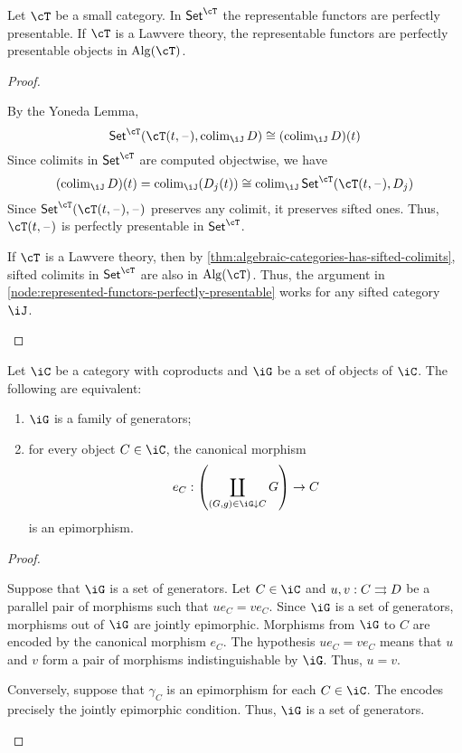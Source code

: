 \documentclass{zett}
\begin{document}
\begin{thm}\label{thm:represented-functors-perfectly-presentable}
  Let $\cT$ be a small category.
  In $\CSet^{\cT}$ the representable functors are perfectly presentable.
  If $\cT$ is a Lawvere theory, the representable functors are perfectly presentable objects in $\Alg(\cT)$.
\end{thm}
\begin{proof}
  \begin{node}\label{node:represented-functors-perfectly-presentable}
    By the Yoneda Lemma,
    \[
      \CSet^{\cT}(\cT(t,\blank), \colim_{\iJ} D) \iso (\colim_{\iJ} D)(t)
    \]
    Since colimits in $\CSet^{\cT}$ are computed objectwise, we have
    \[
      (\colim_{\iJ} D)(t) = \colim_{\iJ}(D_{j}(t)) \iso \colim_{\iJ}\CSet^{\cT}(\cT(t,\blank), D_{j})
    \]
    Since $\CSet^{\cT}(\cT(t,\blank), \blank)$ preserves any colimit, it preserves sifted ones.
    Thus, $\cT(t,\blank)$ is perfectly presentable in $\CSet^{\cT}$.
  \end{node}
  \begin{node}
    If $\cT$ is a Lawvere theory, then by \cref{thm:algebraic-categories-has-sifted-colimits}, sifted colimits in $\CSet^{\cT}$ are also in $\Alg(\cT)$.
    Thus, the argument in \cref{node:represented-functors-perfectly-presentable} works for any sifted category $\iJ$.
  \end{node}
\end{proof}

\begin{lem}\label{lem:coproduct-generators-epimorphism}
  Let $\iC$ be a category with coproducts and $\iG$ be a set of objects of $\iC$.
  The following are equivalent:
  \begin{enumerate}
  \item $\iG$ is a family of generators;
  \item for every object $C \in \iC$, the canonical morphism
    \[
      e_{C} : \left(\coprod_{(G, g) \in \iG \dn C} G\right) \to C
    \]
    is an epimorphism.
  \end{enumerate}
\end{lem}
\begin{proof}
  \begin{node}
    Suppose that $\iG$ is a set of generators.
    Let $C \in \iC$ and $u, v : C \rightrightarrows D$ be a parallel pair of morphisms such that $ue_{C} = ve_{C}$.
    Since $\iG$ is a set of generators, morphisms out of $\iG$ are jointly epimorphic.
    Morphisms from $\iG$ to $C$ are encoded by the canonical morphism $e_{C}$.
    The hypothesis $ue_{C} = ve_{C}$ means that $u$ and $v$ form a pair of morphisms indistinguishable by $\iG$.
    Thus, $u = v$.
  \end{node}
  \begin{node}
    Conversely, suppose that $\gamma_{C}$ is an epimorphism for each $C \in \iC$.
    The encodes precisely the jointly epimorphic condition.
    Thus, $\iG$ is a set of generators.
  \end{node}
\end{proof}
\end{document}
